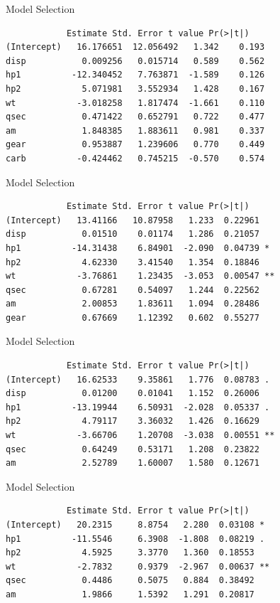 \begin{frame}[fragile]{Model Selection}
    \small{\begin{verbatim}
            Estimate Std. Error t value Pr(>|t|)  
(Intercept)   16.176651  12.056492   1.342    0.193
disp           0.009256   0.015714   0.589    0.562
hp1          -12.340452   7.763871  -1.589    0.126
hp2            5.071981   3.552934   1.428    0.167
wt            -3.018258   1.817474  -1.661    0.110
qsec           0.471422   0.652791   0.722    0.477
am             1.848385   1.883611   0.981    0.337
gear           0.953887   1.239606   0.770    0.449
carb          -0.424462   0.745215  -0.570    0.574
    \end{verbatim}}
\end{frame}

\begin{frame}[fragile]{Model Selection}
    \small{\begin{verbatim}
            Estimate Std. Error t value Pr(>|t|)  
(Intercept)   13.41166   10.87958   1.233  0.22961   
disp           0.01510    0.01174   1.286  0.21057   
hp1          -14.31438    6.84901  -2.090  0.04739 * 
hp2            4.62330    3.41540   1.354  0.18846   
wt            -3.76861    1.23435  -3.053  0.00547 **
qsec           0.67281    0.54097   1.244  0.22562   
am             2.00853    1.83611   1.094  0.28486   
gear           0.67669    1.12392   0.602  0.55277
    \end{verbatim}}
\end{frame}

\begin{frame}[fragile]{Model Selection}
    \small{\begin{verbatim}
            Estimate Std. Error t value Pr(>|t|)  
(Intercept)   16.62533    9.35861   1.776  0.08783 . 
disp           0.01200    0.01041   1.152  0.26006   
hp1          -13.19944    6.50931  -2.028  0.05337 . 
hp2            4.79117    3.36032   1.426  0.16629   
wt            -3.66706    1.20708  -3.038  0.00551 **
qsec           0.64249    0.53171   1.208  0.23822   
am             2.52789    1.60007   1.580  0.12671
    \end{verbatim}}
\end{frame}

\begin{frame}[fragile]{Model Selection}
    \small{\begin{verbatim}
            Estimate Std. Error t value Pr(>|t|)  
(Intercept)   20.2315     8.8754   2.280  0.03108 * 
hp1          -11.5546     6.3908  -1.808  0.08219 . 
hp2            4.5925     3.3770   1.360  0.18553   
wt            -2.7832     0.9379  -2.967  0.00637 **
qsec           0.4486     0.5075   0.884  0.38492   
am             1.9866     1.5392   1.291  0.20817 
    \end{verbatim}}
\end{frame}

